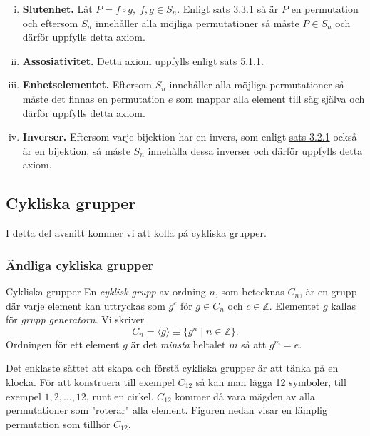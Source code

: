 \documentclass{article}
\theoremstyle{definition}
\begin{document}
\begin{enumerate}[(i)]
  \item \textbf{Slutenhet.} Låt $P = f \circ g, \; f, g \in S_n$. 
  Enligt \hyperlink{kompbij}{sats 3.3.1} så är $P$ en permutation
  och eftersom $S_n$ innehåller alla möjliga permutationer så måste $P \in S_n$ och därför 
  uppfylls detta axiom. %
  \item \textbf{Assosiativitet.} Detta axiom uppfylls enligt \hyperlink{ass}{sats 5.1.1}.
  \item \textbf{Enhetselementet.} Eftersom $S_n$ innehåller alla möjliga permutationer 
  så måste det finnas en permutation $e$ som mappar alla element till säg själva och 
  därför uppfylls detta axiom. 
  \item \textbf{Inverser.} Eftersom varje bijektion har en invers, 
  som enligt \hyperlink{invbij}{sats 3.2.1} också är en bijektion, så måste 
  $S_n$ innehålla dessa inverser och därför uppfylls detta axiom.
\end{enumerate}

\subsection{Cykliska grupper}
I detta del avsnitt kommer vi att kolla på cykliska grupper.

\subsubsection{Ändliga cykliska grupper}
\begin{mydef}{Cykliska grupper}{}
  En \textit{cyklisk grupp} av ordning $n$, som betecknas $C_n$, är en grupp där varje element 
  kan uttryckas som $g^c$ för $g \in C_n$ och $c \in \mathbb{Z}.$ Elementet $g$ kallas för 
  \textit{grupp generatorn}. Vi skriver 
  \[C_n = \langle g  \rangle \equiv \{g^n \; | \; n \in \mathbb{Z}\}.\]
  Ordningen för ett element $g$ är det \textit{minsta} heltalet $m$ så att $g^m = e$. 
\end{mydef}
Det enklaste sättet att skapa och förstå cykliska grupper är att tänka på en klocka. 
För att konstruera till exempel $C_{12}$ så kan man lägga 12 symboler, till exempel 
$1, 2, \ldots, 12$, runt en cirkel. $C_{12}$ kommer då vara mägden av alla permutationer 
som "roterar" alla element. Figuren nedan visar en lämplig permutation som tillhör $C_{12}.$
\end{document}
